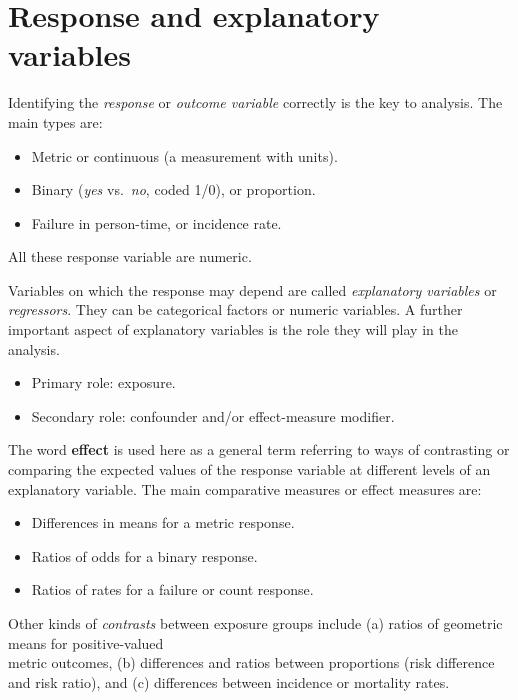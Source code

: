 \documentclass[
]{book}
\providecommand{\tightlist}{%
  \setlength{\itemsep}{0pt}\setlength{\parskip}{0pt}}
\begin{document}
\section{Response and explanatory variables}\label{response-and-explanatory-variables}

Identifying the \emph{response} or \emph{outcome variable} correctly is the key
to analysis. The main types are:

\begin{itemize}
\tightlist
\item
  Metric or continuous (a measurement with units).
\item
  Binary (\emph{yes} vs.~\emph{no}, coded 1/0), or proportion.
\item
  Failure in person-time, or incidence rate.
\end{itemize}

All these response variable are numeric.

Variables on which the response may depend are called \emph{explanatory
variables} or \emph{regressors}. They can be categorical factors or numeric variables.
A further important aspect of explanatory variables is the role they will play in the analysis.

\begin{itemize}
\tightlist
\item
  Primary role: exposure.
\item
  Secondary role: confounder and/or effect-measure modifier.
\end{itemize}

The word \textbf{effect}
is used here as a general term referring to ways of
contrasting or comparing the expected values of the response variable at
different levels of an explanatory
variable. The main comparative measures or effect measures are:

\begin{itemize}
\tightlist
\item
  Differences in means for a metric response.
\item
  Ratios of odds for a binary response.
\item
  Ratios of rates for a failure or count response.
\end{itemize}

Other kinds of \emph{contrasts} between exposure groups
include (a) ratios of geometric means for positive-valued\\
metric outcomes,
(b) differences and ratios between proportions
(risk difference and risk ratio), and (c)
differences between incidence or mortality rates.
\end{document}
